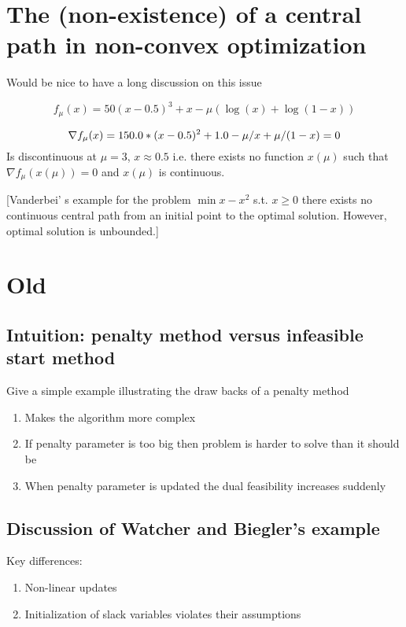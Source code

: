 \documentclass{article}
\begin{document}
\section{The (non-existence) of a central path in non-convex optimization}\label{app:non-existence-of-central-path}

Would be nice to have a long discussion on this issue

$$
f_{\mu}(x) = 50 (x - 0.5)^3 + x - \mu (\log(x) + \log(1 - x))
$$

$$
\nabla f_{\mu}(x) = 150.0 * (x - 0.5)^2 + 1.0  - \mu / x + \mu / (1 - x) = 0 \\
$$
Is discontinuous at $\mu = 3$, $x \approx 0.5$ i.e. there exists no function $x(\mu)$ such that $\nabla f_{\mu}(x(\mu)) = 0$ and $x(\mu)$ is continuous. 

[Vanderbei' s example for the problem $\min{ x -x^2}$ s.t. $x \ge 0$ there exists no continuous central path from an initial point to the optimal solution. However, optimal solution is unbounded.]


\section{Old}

\subsection{Intuition: penalty method versus infeasible start method}

Give a simple example illustrating the draw backs of a penalty method
\begin{enumerate}
\item Makes the algorithm more complex
\item If penalty parameter is too big then problem is harder to solve than it should be
\item When penalty parameter is updated the dual feasibility increases suddenly
\end{enumerate}

\subsection{Discussion of Watcher and Biegler's example}

Key differences:
\begin{enumerate}
\item Non-linear updates
\item Initialization of slack variables violates their assumptions
\end{enumerate}
\end{document}
